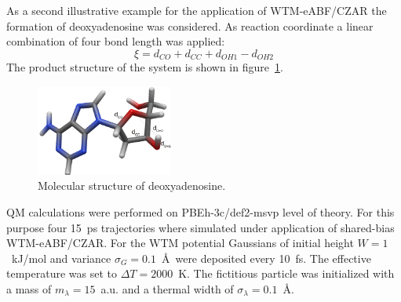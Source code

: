 \newpage
As a second illustrative example for the application of WTM-eABF/CZAR the formation of deoxyadenosine was considered.
As reaction coordinate a linear combination of four bond length was applied:
\begin{equation}
  \xi = d_{CO} + d_{CC} + d_{OH1} - d_{OH2} \label{eq:CV ool}
\end{equation}
The product structure of the system is shown in figure~\ref{fig:cl-f-eth}.
\begin{figure}[H]
    \centering
    \includegraphics[width=0.4\textwidth]{bilder/ool_atoms}
    \caption{Molecular structure of deoxyadenosine. }
\label{fig:cl-f-eth}%
\end{figure}
QM calculations were performed on PBEh-3c/def2-msvp\autocite{keal2005semiempirical} level of theory.
For this purpose four 15~ps trajectories where simulated under application of shared-bias WTM-eABF/CZAR.
For the WTM potential Gaussians of initial height $W=1$~kJ/mol and variance $\sigma_G=0.1$~\AA~were deposited every 10~fs.
The effective temperature was set to $\Delta T=2000$~K.
The fictitious particle was initialized with a mass of $m_\lambda=15$~a.u. and a thermal width of $\sigma_\lambda=0.1$~\AA.
